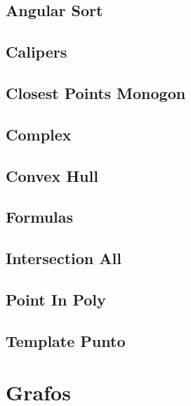 \documentclass[9pt,portrait,twocolumn,a4paper,notitlepage]{article}
\newcommand\cppfile[2][]{%
\ifstrempty{#1}{}{}%
}
\begin{document}
\subsection{Angular Sort}
\cppfile{geometry_clean/angular_sort.cpp}

\subsection{Calipers}
\cppfile{geometry_clean/calipers.cpp}

\subsection{Closest Points Monogon}
\cppfile{geometry_clean/closest_points_Monogon.cpp}

\subsection{Complex}
\cppfile{geometry_clean/complex.cpp}

\subsection{Convex Hull}
\cppfile{geometry_clean/convex_hull.cpp}

\subsection{Formulas}
\cppfile{geometry_clean/formulas.cpp}

\subsection{Intersection All}
\cppfile{geometry_clean/intersection_all.cpp}

\subsection{Point In Poly}
\cppfile{geometry_clean/point_in_poly.cpp}

\subsection{Template Punto}
\cppfile{geometry_clean/template_punto.cpp}


\section{Grafos}
\end{document}
